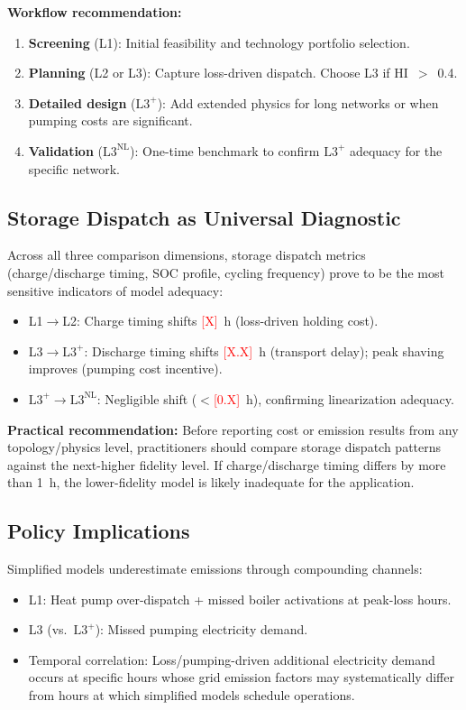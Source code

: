 \documentclass[review,3p]{elsarticle}
\newcommand{\placeholder}[1]{\textcolor{red}{[#1]}}
\newcommand{\Lplus}{\mathrm{L3}^{+}}
\newcommand{\Lnl}{\mathrm{L3}^{\mathrm{NL}}}
\begin{document}
\textbf{Workflow recommendation:}
\begin{enumerate}[nosep]
    \item \textbf{Screening} (L1): Initial feasibility and
    technology portfolio selection.
    \item \textbf{Planning} (L2 or L3): Capture loss-driven
    dispatch. Choose L3 if HI~$>$~0.4.
    \item \textbf{Detailed design} ($\Lplus$): Add extended physics
    for long networks or when pumping costs are significant.
    \item \textbf{Validation} ($\Lnl$): One-time benchmark to
    confirm $\Lplus$ adequacy for the specific network.
\end{enumerate}

\subsection{Storage Dispatch as Universal Diagnostic}
\label{sec:disc_storage_diagnostic}

Across all three comparison dimensions, storage dispatch metrics
(charge/discharge timing, SOC profile, cycling frequency) prove to
be the most sensitive indicators of model adequacy:
\begin{itemize}[nosep]
    \item L1$\to$L2: Charge timing shifts
    \placeholder{X}~h (loss-driven holding cost).
    \item L3$\to\Lplus$: Discharge timing shifts
    \placeholder{X.X}~h (transport delay); peak shaving
    improves (pumping cost incentive).
    \item $\Lplus\to\Lnl$: Negligible shift
    ($<$\placeholder{0.X}~h), confirming linearization
    adequacy.
\end{itemize}

\textbf{Practical recommendation:} Before reporting cost or
emission results from any topology/physics level, practitioners
should compare storage dispatch patterns against the next-higher
fidelity level. If charge/discharge timing differs by more than
1~h, the lower-fidelity model is likely inadequate for the
application.

\subsection{ Policy Implications}
\label{sec:disc_co2}

Simplified models underestimate  emissions through
compounding channels:
\begin{itemize}[nosep]
    \item L1: Heat pump over-dispatch + missed boiler activations
    at peak-loss hours.
    \item L3 (vs.\ $\Lplus$): Missed pumping electricity demand.
    \item Temporal correlation: Loss/pumping-driven additional
    electricity demand occurs at specific hours whose grid
    emission factors may systematically differ from hours at
    which simplified models schedule operations.
\end{itemize}
\end{document}
